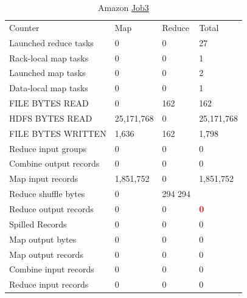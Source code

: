 \documentclass[paper=a4, fontsize=11pt]{scrartcl}	%
\numberwithin{equation}{section}															%
\numberwithin{figure}{section}																%
\numberwithin{table}{section}																%
\begin{document}
\begin{table}[!h]
	\centering
	\caption{Amazon \href{http://hadoop-compute0.di.univr.it:50030/jobdetails.jsp?jobid=job_201603141010_12298}{Job3}}
	\label{my-label}
	\begin{tabular}{llll}
		Counter&	Map&	Reduce&	Total\\
		Launched reduce tasks&	0&	0&	27\\
		Rack-local map tasks&	0&	0&	1\\
		Launched map tasks&	0&	0&	2\\
		Data-local map tasks&	0&	0&	1\\
		FILE BYTES READ&	0&	162&	162\\
		HDFS BYTES READ&	25,171,768&	0&	25,171,768\\
		FILE BYTES WRITTEN&	1,636&	162&	1,798\\
		Reduce input groups&	0&	0&	0\\
		Combine output records&	0&	0&	0\\
		Map input records&	1,851,752&	0&	1,851,752\\
		Reduce shuffle bytes&	0&	294	294\\
		Reduce output records&	0&	0&	\textbf{\textcolor{red}{0}}\\
		Spilled Records&	0&	0&	0\\
		Map output bytes&	0&	0&	0\\
		Map output records&	0&	0&	0\\
		Combine input records&	0&	0&	0\\
		Reduce input records&	0&	0&	0\\
	\end{tabular}
\end{table}
\end{document}
